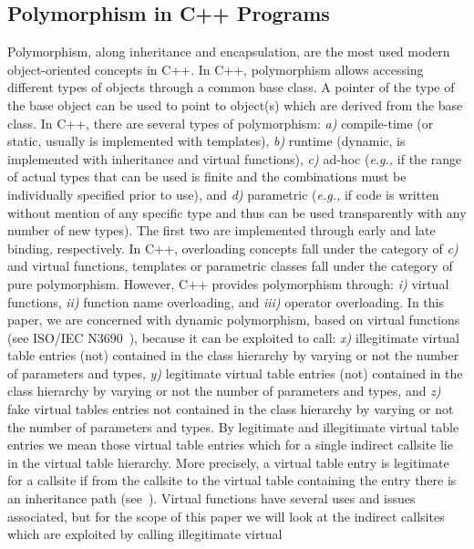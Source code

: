 \subsection{Polymorphism in C++ Programs}
\label{Polymorphism in C++}
Polymorphism, along inheritance and encapsulation, are the most used modern object-oriented concepts in C++. In C++, polymorphism allows accessing different types of objects 
through a common base class. A pointer of the type of the base object can be used to point to object(s) which are derived from the base class. In C++, there are several types of polymorphism:
\textit{a)} compile-time (or static, usually is implemented with templates), 
\textit{b)} runtime (dynamic, is implemented with inheritance and virtual functions), 
\textit{c)} ad-hoc (\textit{e.g.,} if the range of actual types that can be used is finite and the combinations must be individually specified prior to use), and
\textit{d)} parametric (\textit{e.g.,} if code is written without mention of any specific type and thus can be used transparently with any number of new types). 
The first two are implemented through early and late binding, respectively. In C++, overloading concepts fall under the category of \textit{c)} and virtual functions, 
templates or parametric classes fall under the category of pure polymorphism. However, C++ provides polymorphism through: 
\textit{i)} virtual functions,
\textit{ii)} function name overloading, and 
\textit{iii)} operator overloading. 
In this paper, we are concerned with dynamic polymorphism, based on virtual functions (see ISO/IEC N3690~\cite{iso:iecN3690}), because it can be exploited to call: 
\textit{x)} illegitimate virtual table entries (not) contained in the class hierarchy by varying or not the number of parameters and types,
\textit{y)} legitimate virtual table entries (not) contained in the class hierarchy by varying or not the number of parameters and types, and 
\textit{z)} fake virtual tables entries not contained in the class hierarchy by varying or not the number of parameters and types.
By legitimate and illegitimate virtual table entries we mean those virtual table entries which for a single indirect callsite lie in the virtual table hierarchy. More 
precisely, a virtual table entry is legitimate for a callsite if from the callsite to the virtual table containing the entry there is an inheritance path (see~\cite{haller:shrinkwrap}). 
Virtual functions have several uses and issues associated, but for the scope of this paper we will look at the indirect callsites which are exploited by calling illegitimate virtual 
